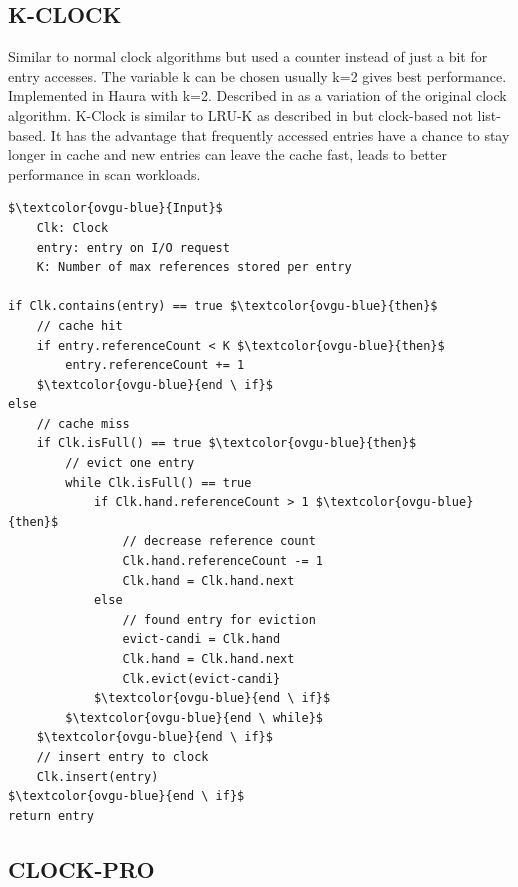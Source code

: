 \documentclass[
	12pt,
	a4paper,
	abstract,
	bibliography=totoc,
	chapterprefix,
	headings=openright,
	numbers=endperiod,
	parskip=half,
	twoside,
]{scrreprt}
\begin{document}

\subsection{K-CLOCK}

Similar to normal clock algorithms but used a counter instead of just a bit for entry accesses.
The variable k can be chosen usually k=2 gives best performance.
Implemented in Haura with k=2.
Described in \cite{corbato1968paging} as a variation of the original clock algorithm.
K-Clock is similar to LRU-K as described in \cite{o1993lru} but clock-based not list-based.
It has the advantage that frequently accessed entries have a chance to stay longer in cache and new entries can leave the cache fast, leads to better performance in scan workloads.

\begin{lstlisting}[mathescape=true,caption=K-Clock replacement algorithm in pseudocode,label=lst:k-clock-algorithm]
$\textcolor{ovgu-blue}{Input}$
	Clk: Clock
	entry: entry on I/O request
	K: Number of max references stored per entry

if Clk.contains(entry) == true $\textcolor{ovgu-blue}{then}$
	// cache hit
	if entry.referenceCount < K $\textcolor{ovgu-blue}{then}$
		entry.referenceCount += 1
	$\textcolor{ovgu-blue}{end \ if}$
else
	// cache miss
	if Clk.isFull() == true $\textcolor{ovgu-blue}{then}$
		// evict one entry
		while Clk.isFull() == true
			if Clk.hand.referenceCount > 1 $\textcolor{ovgu-blue}{then}$
				// decrease reference count 
				Clk.hand.referenceCount -= 1
				Clk.hand = Clk.hand.next
			else
				// found entry for eviction 
				evict-candi = Clk.hand
				Clk.hand = Clk.hand.next
				Clk.evict(evict-candi}
			$\textcolor{ovgu-blue}{end \ if}$
		$\textcolor{ovgu-blue}{end \ while}$
	$\textcolor{ovgu-blue}{end \ if}$
	// insert entry to clock
	Clk.insert(entry)
$\textcolor{ovgu-blue}{end \ if}$
return entry 
\end{lstlisting}

\subsection{CLOCK-PRO}
\end{document}
